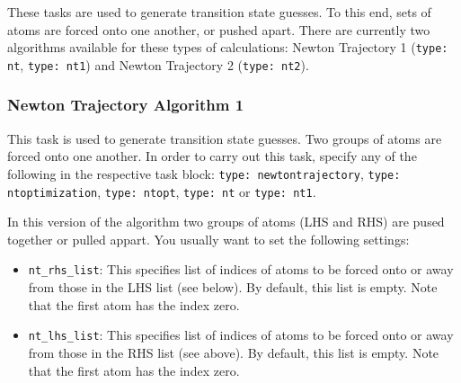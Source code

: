 \documentclass[]{tufte-book}
\begin{document}
These tasks are used to generate transition state guesses.
To this end, sets of atoms are forced onto one another, or pushed apart.
There are currently two algorithms available for these types of calculations:
Newton Trajectory 1 (\texttt{type: nt}, \texttt{type: nt1}) and Newton Trajectory 2 (\texttt{type: nt2}).

\subsubsection{Newton Trajectory Algorithm 1}

This task is used to generate transition state guesses. Two groups of atoms are forced onto one another.
In order to carry out this task, specify any of the following in the respective task block:
\texttt{type: newtontrajectory}, \texttt{type: ntoptimization}, \texttt{type: ntopt}, \texttt{type: nt} or \texttt{type: nt1}.

In this version of the algorithm two groups of atoms (LHS and RHS) are pused together or pulled appart.
You usually want to set the following settings:
\begin{itemize}
\item \texttt{nt\_rhs\_list}: This specifies list of indices of atoms to be forced onto or away from those
in the LHS list (see below). By default, this list is empty. Note that the first atom has the index zero.
\item \texttt{nt\_lhs\_list}: This specifies list of indices of atoms to be forced onto or away from those
in the RHS list (see above). By default, this list is empty. Note that the first atom has the index zero.
\end{itemize}
\end{document}
